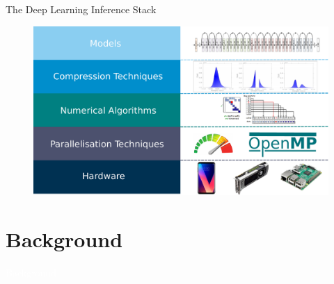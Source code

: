 \documentclass[xcolor=dvipsnames]{beamer}
\begin{document}
\begin{frame}{The Deep Learning Inference Stack}
\begin{figure}
    \centering
    \includegraphics[width=\linewidth]{images/inference-stack.pdf}
\end{figure}
\end{frame}



\section{Background}

{
\begin{frame}
    \centering
    \textcolor{white}{\LARGE Background}
\end{frame}
}









\end{document}
